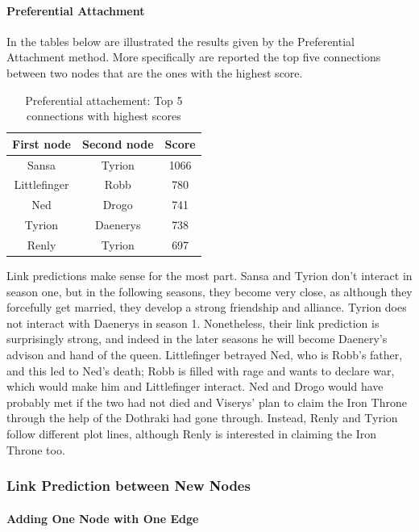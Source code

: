 \documentclass[10pt,twocolumn,letterpaper]{article}
\begin{document}
\paragraph{Preferential Attachment}
In the tables below are illustrated the results given by the Preferential Attachment method. More specifically are reported the top five connections between two nodes that are the ones with the highest score.
\begin{table}[!h]
    \centering
    \small
    \begin{tabular}{c|c|c} 
    First node & Second node & Score \\
    \hline
    Sansa & Tyrion & 1066 \\
    Littlefinger & Robb	& 780 \\
    Ned & Drogo & 741 \\
    Tyrion & Daenerys &	738 \\
    Renly & Tyrion & 697 \\
    \hline 
    \end{tabular}
    \caption{Preferential attachement: Top 5 connections with highest scores}
    \label{tab:my_label}
\end{table}

Link predictions make sense for the most part. Sansa and Tyrion don't interact in season one, but in the following seasons, they become very close, as although they forcefully get married, they develop a strong friendship and alliance. Tyrion does not interact with Daenerys in season 1. Nonetheless, their link prediction is surprisingly strong, and indeed in the later seasons he will become Daenery's advison and hand of the queen. Littlefinger betrayed Ned, who is Robb's father, and this led to Ned's death; Robb is filled with rage and wants to declare war, which would make him and Littlefinger interact.
Ned and Drogo would have probably met if the two had not died and Viserys' plan to claim the Iron Throne through the help of the Dothraki had gone through.
Instead, Renly and Tyrion follow different plot lines, although Renly is interested in claiming the Iron Throne too. 


\subsubsection{Link Prediction between New Nodes}

\paragraph{Adding One Node with One Edge}
\end{document}
